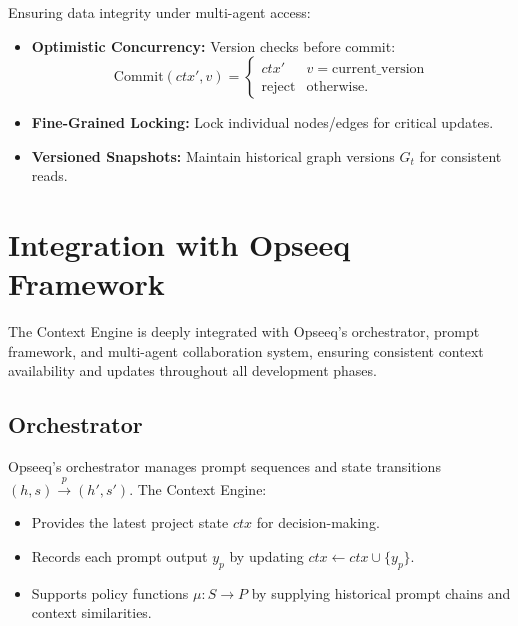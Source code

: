 \documentclass[11pt]{article}
\begin{document}
Ensuring data integrity under multi-agent access:

\begin{itemize}
  \item \textbf{Optimistic Concurrency:} Version checks before commit:
    \[
      \mathrm{Commit}(ctx',v)=
      \begin{cases}
        ctx' & v=\text{current\_version}\\
        \text{reject} & \text{otherwise}.
      \end{cases}
    \]
  \item \textbf{Fine-Grained Locking:} Lock individual nodes/edges for critical updates.
  \item \textbf{Versioned Snapshots:} Maintain historical graph versions \(G_t\) for consistent reads.
\end{itemize}

\section{Integration with Opseeq Framework}
\label{sec:integration}

The Context Engine is deeply integrated with Opseeq’s orchestrator, prompt framework, and multi-agent collaboration system, ensuring consistent context availability and updates throughout all development phases.

\subsection{Orchestrator}
\label{subsec:orchestrator}

Opseeq’s orchestrator manages prompt sequences and state transitions \((h, s)\xrightarrow{p}(h', s')\). The Context Engine:

\begin{itemize}
  \item Provides the latest project state \(ctx\) for decision-making.
  \item Records each prompt output \(y_p\) by updating \(ctx\gets ctx\cup\{y_p\}\).
  \item Supports policy functions \(\mu: S\rightarrow P\) by supplying historical prompt chains and context similarities.
\end{itemize}
\end{document}
